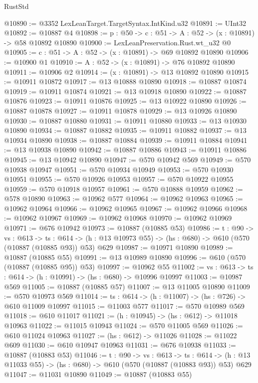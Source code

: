 \begin{lexlean}{RustStd}
\begin{coremodule}
@10890 := @3352 LexLeanTarget.TargetSyntax.IntKind.u32
@10891 := UInt32
@10892 := @10887 @4
@10898 := {p : @50} -> {c : @51} -> {A : @52} -> (x : @10891) -> @58 @10892 @10890
@10900 := LexLeanPreservation.Rust.wt_u32 @0
@10905 := {c : @51} -> {A : @52} -> (x : @10891) -> @69 @10892 @10890
@10906 := @10900 @1
@10910 := {A : @52} -> (x : @10891) -> @76 @10892 @10890
@10911 := @10906 @2
@10914 := (x : @10891) -> @13 @10892 @10890
@10915 := @10911 @10872
@10917 := @13 @10888 @10890
@10918 := @10887 @10874
@10919 := @10911 @10874
@10921 := @13 @10918 @10890
@10922 := @10887 @10876
@10923 := @10911 @10876
@10925 := @13 @10922 @10890
@10926 := @10887 @10878
@10927 := @10911 @10878
@10929 := @13 @10926 @10890
@10930 := @10887 @10880
@10931 := @10911 @10880
@10933 := @13 @10930 @10890
@10934 := @10887 @10882
@10935 := @10911 @10882
@10937 := @13 @10934 @10890
@10938 := @10887 @10884
@10939 := @10911 @10884
@10941 := @13 @10938 @10890
@10942 := @10887 @10886
@10943 := @10911 @10886
@10945 := @13 @10942 @10890
@10947 := @570 @10942 @569
@10949 := @570 @10938 @10947
@10951 := @570 @10934 @10949
@10953 := @570 @10930 @10951
@10955 := @570 @10926 @10953
@10957 := @570 @10922 @10955
@10959 := @570 @10918 @10957
@10961 := @570 @10888 @10959
@10962 := @578 @10890
@10963 := @10962 @577
@10964 := @10962 @10963
@10965 := @10962 @10964
@10966 := @10962 @10965
@10967 := @10962 @10966
@10968 := @10962 @10967
@10969 := @10962 @10968
@10970 := @10962 @10969
@10971 := @676 @10942
@10973 := @10887 (@10885 @53)
@10986 := {t : @90} ->
  {vs : @613} ->
  {ts : @614} -> (h : @13 @10973 @55) -> (hs : @680) -> @610 (@570 (@10887 (@10885 @93)) @53) @629
@10987 := @10971 @10890
@10989 := @10887 (@10885 @55)
@10991 := @13 @10989 @10890
@10996 := @610 (@570 (@10887 (@10885 @95)) @53)
@10997 := @10962 @55
@11002 := {vs : @613} -> {ts : @614} -> (h : @10991) -> (hs : @680) -> @10996 @10997
@11003 := @10987 @569
@11005 := @10887 (@10885 @57)
@11007 := @13 @11005 @10890
@11009 := @570 @10973 @569
@11014 := {ts : @614} -> (h : @11007) -> (hs : @726) -> @610 @11009 @10997
@11015 := @11003 @577
@11017 := @570 @10989 @569
@11018 := @610 @11017
@11021 := (h : @10945) -> (hs : @612) -> @11018 @10963
@11022 := @11015 @10943
@11024 := @570 @11005 @569
@11026 := @610 @11024 @10963
@11027 := (hs : @612) -> @11026
@11028 := @11022 @609
@11030 := @610 @10947 @10963
@11031 := @676 @10938
@11033 := @10887 (@10883 @53)
@11046 := {t : @90} ->
  {vs : @613} ->
  {ts : @614} -> (h : @13 @11033 @55) -> (hs : @680) -> @610 (@570 (@10887 (@10883 @93)) @53) @629
@11047 := @11031 @10890
@11049 := @10887 (@10883 @55)

\end{coremodule}
\end{lexlean}
